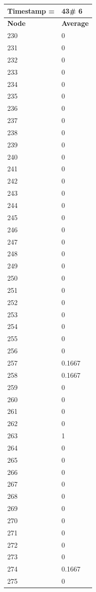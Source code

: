 \begin{tabular}{|l||l|}
\hline
\textbf{Timestamp =} & \textbf{43}\# 6\\\hline
	\textbf{Node} & \textbf{Average} \\ \hline
\hline
	230 & 0 \\ \hline
	231 & 0 \\ \hline
	232 & 0 \\ \hline
	233 & 0 \\ \hline
	234 & 0 \\ \hline
	235 & 0 \\ \hline
	236 & 0 \\ \hline
	237 & 0 \\ \hline
	238 & 0 \\ \hline
	239 & 0 \\ \hline
	240 & 0 \\ \hline
	241 & 0 \\ \hline
	242 & 0 \\ \hline
	243 & 0 \\ \hline
	244 & 0 \\ \hline
	245 & 0 \\ \hline
	246 & 0 \\ \hline
	247 & 0 \\ \hline
	248 & 0 \\ \hline
	249 & 0 \\ \hline
	250 & 0 \\ \hline
	251 & 0 \\ \hline
	252 & 0 \\ \hline
	253 & 0 \\ \hline
	254 & 0 \\ \hline
	255 & 0 \\ \hline
	256 & 0 \\ \hline
	257 & 0.1667 \\ \hline
	258 & 0.1667 \\ \hline
	259 & 0 \\ \hline
	260 & 0 \\ \hline
	261 & 0 \\ \hline
	262 & 0 \\ \hline
	263 & 1 \\ \hline
	264 & 0 \\ \hline
	265 & 0 \\ \hline
	266 & 0 \\ \hline
	267 & 0 \\ \hline
	268 & 0 \\ \hline
	269 & 0 \\ \hline
	270 & 0 \\ \hline
	271 & 0 \\ \hline
	272 & 0 \\ \hline
	273 & 0 \\ \hline
	274 & 0.1667 \\ \hline
	275 & 0 \\ \hline
\end{tabular}

